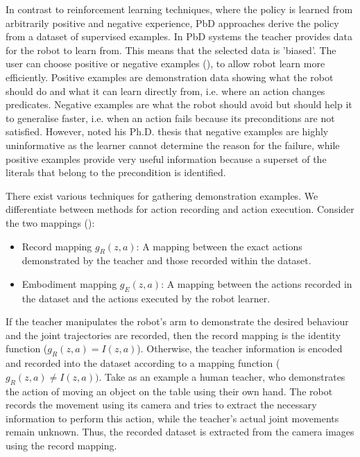In contrast to reinforcement learning techniques, where the policy is learned from arbitrarily positive and negative experience, PbD approaches derive the policy from a dataset of supervised examples.
In PbD systems the teacher provides data for the robot to learn from.
This means that the selected data is 'biased'. 
The user can choose positive or negative examples (\cite{grollman2012robot}), to allow robot learn more efficiently.
Positive examples are demonstration data showing what the robot should do and what it can learn directly from, i.e. where an action changes predicates.
Negative examples are what the robot should avoid but should help it to generalise faster, i.e. when an action fails because its preconditions are not satisfied.
However, \cite{walsh2010efficient} noted his Ph.D. thesis that negative examples are highly uninformative as the learner cannot determine the reason for the failure, while positive examples provide very useful information because a superset of the literals that belong to the precondition is identified.

There exist various techniques for gathering demonstration examples.
 We differentiate between methods for action recording and action execution.
 Consider the two mappings (\cite{argall2009survey}):
\begin{itemize}
\item Record mapping $g_R(z,a)$: A mapping between the exact actions demonstrated by the teacher and those recorded within the dataset.
\item Embodiment mapping $g_E(z,a)$: A mapping between the actions recorded in the dataset and the actions executed by the robot learner.
\end{itemize}
If the teacher manipulates the robot's arm to demonstrate the desired behaviour and the joint trajectories are recorded, then the record mapping is the identity function ($g_R(z,a) = I(z,a)$).
 Otherwise, the teacher information is encoded and recorded into the dataset according to a mapping function ($g_R(z,a) \neq I(z,a))$.
 Take as an example a human teacher, who demonstrates the action of moving an object on the table using their own hand.
 The robot records the movement using its camera and tries to extract the necessary information to perform this action, while the teacher's actual joint movements remain unknown.
 Thus, the recorded dataset is extracted from the camera images using the record mapping.

